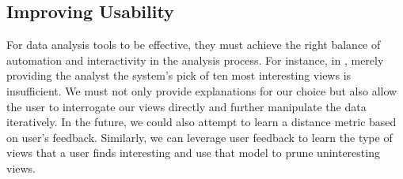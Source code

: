 \subsection{Improving Usability} 
For data analysis tools to be effective,
they must achieve the right balance of automation and interactivity in the analysis
process.
For instance, in \SeeDB, merely providing the analyst the system's pick of ten
most interesting views is insufficient. 
We must not only provide explanations
for our choice but also allow the user to interrogate our views directly and
further manipulate the data iteratively. 
In the future, we could also attempt to learn a distance metric based on user's
feedback. Similarly, we can leverage user feedback to learn the type of views
that a user finds interesting and use that model to prune uninteresting views.


